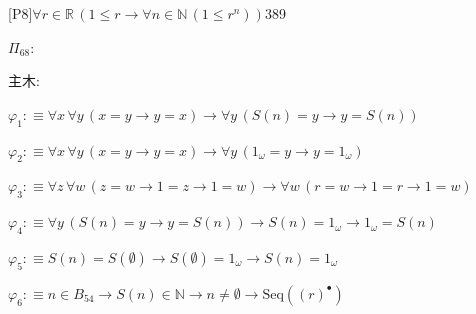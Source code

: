\begin{fullproof}{[P8]}{$\forall r \in \mathbb{R}\,(1 \leq r \to \forall n \in \mathbb{N}\,(1 \leq {{r}^{n}}))$}{389}
\begin{ptree}
\noLine
{}
\noLine
{}
\end{ptree}
\noindent$\Pi_{68}$:
\begin{ptree}
\noLine
{}
\end{ptree}
\noindent 主木:
\begin{ptree}
\noLine
{}
\end{ptree}
\begin{abbrevlist}
\item $\varphi_{1} :\equiv \forall x\,\forall y\,(x = y \to y = x) \to \forall y\,(S(n) = y \to y = S(n))$
\item $\varphi_{2} :\equiv \forall x\,\forall y\,(x = y \to y = x) \to \forall y\,(1_{\omega} = y \to y = 1_{\omega})$
\item $\varphi_{3} :\equiv \forall z\,\forall w\,(z = w \to 1 = z \to 1 = w) \to \forall w\,(r = w \to 1 = r \to 1 = w)$
\item $\varphi_{4} :\equiv \forall y\,(S(n) = y \to y = S(n)) \to S(n) = 1_{\omega} \to 1_{\omega} = S(n)$
\item $\varphi_{5} :\equiv S(n) = S(\emptyset) \to S(\emptyset) = 1_{\omega} \to S(n) = 1_{\omega}$
\item $\varphi_{6} :\equiv n \in B_{54} \to S(n) \in \mathbb{N} \to n \neq \emptyset \to \mathrm{Seq}({(r)^{\bullet}})$

\end{abbrevlist}
\end{fullproof}
